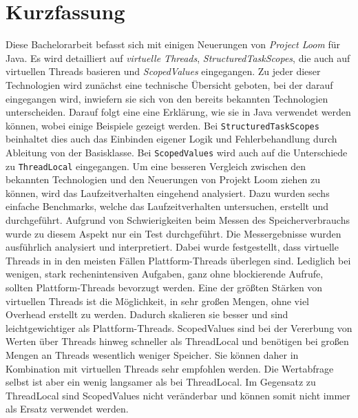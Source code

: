 \chapter{Kurzfassung}

    Diese Bachelorarbeit befasst sich mit einigen Neuerungen von \emph{Project Loom} für Java. Es wird detailliert auf \emph{virtuelle Threads}, \emph{StructuredTaskScopes},
    die auch auf virtuellen Threads basieren
    und \emph{ScopedValues} eingegangen.
    Zu jeder dieser Technologien wird zunächst eine technische Übersicht geboten, bei der darauf eingegangen wird, inwiefern sie sich von den bereits bekannten Technologien unterscheiden.
    Darauf folgt eine eine Erklärung, wie sie in Java verwendet werden können, wobei einige Beispiele gezeigt werden. 
    Bei \texttt{StructuredTaskScopes} beinhaltet dies auch das Einbinden eigener Logik und Fehlerbehandlung durch Ableitung von der Basisklasse. Bei \texttt{ScopedValues} wird auch auf die Unterschiede zu \texttt{ThreadLocal} eingegangen. 
    Um eine besseren Vergleich zwischen den bekannten Technologien und den Neuerungen von Projekt Loom ziehen zu können, wird das Laufzeitverhalten eingehend analysiert. Dazu wurden sechs einfache Benchmarks,
    welche das Laufzeitverhalten untersuchen, erstellt und durchgeführt. Aufgrund von Schwierigkeiten
    beim Messen des Speicherverbrauchs wurde zu diesem Aspekt nur ein Test durchgeführt. Die Messergebnisse wurden ausführlich analysiert und interpretiert.
    Dabei wurde festgestellt, dass virtuelle Threads in in den meisten Fällen Plattform-Threads überlegen sind. Lediglich bei wenigen, stark rechenintensiven Aufgaben, ganz ohne blockierende Aufrufe, 
    sollten Plattform-Threads bevorzugt werden. Eine der größten Stärken von virtuellen Threads ist die Möglichkeit, in sehr großen Mengen, ohne viel Overhead erstellt zu werden. 
    Dadurch skalieren sie besser und sind leichtgewichtiger als Plattform-Threads.
    ScopedValues sind bei der Vererbung von Werten über Threads hinweg schneller als ThreadLocal und benötigen bei großen Mengen an Threads wesentlich weniger Speicher. 
    Sie können daher in Kombination mit virtuellen Threads sehr empfohlen werden. Die Wertabfrage selbst ist aber ein wenig langsamer als bei ThreadLocal.
    Im Gegensatz zu ThreadLocal sind ScopedValues nicht veränderbar und können somit nicht immer als Ersatz verwendet werden.
